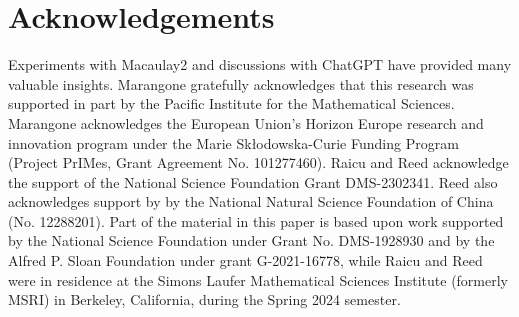 \documentclass[11pt,reqno]{amsart}
\theoremstyle{definition}
\theoremstyle{remark}
\numberwithin{equation}{section}
\begin{document}
\section*{Acknowledgements}
Experiments with Macaulay2 \cite{GS} and discussions with ChatGPT \cite{ChatGPT} have provided many valuable insights. Marangone gratefully acknowledges that this research was supported in part by the Pacific Institute for the Mathematical Sciences. Marangone acknowledges the European Union’s Horizon Europe research and innovation program under the Marie Skłodowska-Curie Funding Program (Project PrIMes, Grant Agreement No. 101277460). Raicu and Reed acknowledge the support of the National Science Foundation Grant DMS-2302341. Reed also acknowledges support by by the National Natural Science Foundation of China (No. 12288201). Part of the material in this paper is based upon work supported by the National Science Foundation under Grant No. DMS-1928930 and by the Alfred P. Sloan Foundation under grant G-2021-16778, while Raicu and Reed were in residence at the Simons Laufer Mathematical Sciences Institute (formerly MSRI) in Berkeley, California, during the Spring 2024 semester.
\end{document}

